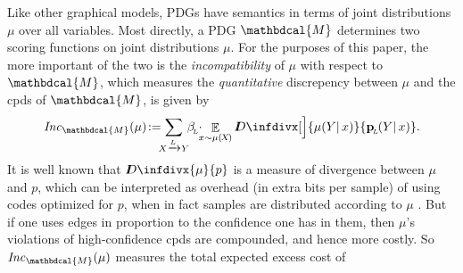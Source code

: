 \documentclass[twoside]{article}
\theoremstyle{plain}
\theoremstyle{definition}
\DeclareMathOperator*{\Ex}{\mathbb{E}} %
\newcommand{\mat}[1]{\mathbf{#1}}
\newcommand{\thickD}{I\mkern-8muD}
\newcommand{\kldiv}{\thickD\infdivx}
\newcommand{\ssub}[1]{_{\!_{#1}\!}}
\newcommand{\bp}[1][L]{\mat{p}\ssub{#1}}
\newcommand{\dg}[1]{\mathbdcal{#1}}
\newcommand\Inc{\mathit{Inc}}
\newcommand{\IDef}[1]{\mathit{IDef}_{\!#1}}
\newcommand{\ed}[3]{%
		\mathchoice%
		{#2\overset{\smash{\mskip-5mu\raisebox{-3pt}{${#1}$}}}{\xrightarrow{\hphantom{\scriptstyle {#1}}}} #3} %
		{#2\overset{\smash{\mskip-5mu\raisebox{-3pt}{$\scriptstyle {#1}$}}}{\xrightarrow{\hphantom{\scriptstyle {#1}}}} #3}%
		{#2\overset{\smash{\mskip-5mu\raisebox{-3pt}{$\scriptscriptstyle {#1}$}}}{\xrightarrow{\hphantom{\scriptscriptstyle {#1}}}} #3} %
		{#2\overset{\smash{\mskip-5mu\raisebox{-3pt}{$\scriptscriptstyle {#1}$}}}{\xrightarrow{\hphantom{\scriptscriptstyle {#1}}}} #3}} %
\begin{document}
Like other graphical models, PDGs have semantics in terms of joint distributions $\mu$ over all variables.
Most directly, a PDG $\dg M$ determines two scoring functions on joint
distributions $\mu$. For the purposes of this paper, the more
important of the two is the 
\emph{incompatibility} of $\mu$ with respect to $\dg M$, which
measures the \emph{quantitative} discrepency between $\mu$ and the
cpds of $\dg M$, is given by 
\begin{equation}
    \Inc_{\dg M}(\mu)\! := \!\!\!\sum_{\ed LXY}\!\! \beta\ssub L \!\cdot\!\!\! \Ex_{{x \sim \mu(\mskip-2.6muX\mskip-2mu)}} \kldiv[\Big]{\mu(Y|\, x)}{\bp(Y |\, x)}.
    \label{eq:inc}
\end{equation}
It is well known that $\kldiv{\mu}{p}$ is a measure of divergence between $\mu$ and $p$, which can be interpreted as overhead (in extra bits per sample) of using codes optimized for $p$, when in fact samples are distributed according to $\mu$ \cite{mackay2003information:relentropy}.
But if one uses edges in proportion to the confidence one has in
them, then $\mu$'s violations of high-confidence cpds are compounded,
and hence more costly. 
So $\Inc_{\dg M}(\mu)$ measures the total expected excess cost of
\end{document}
